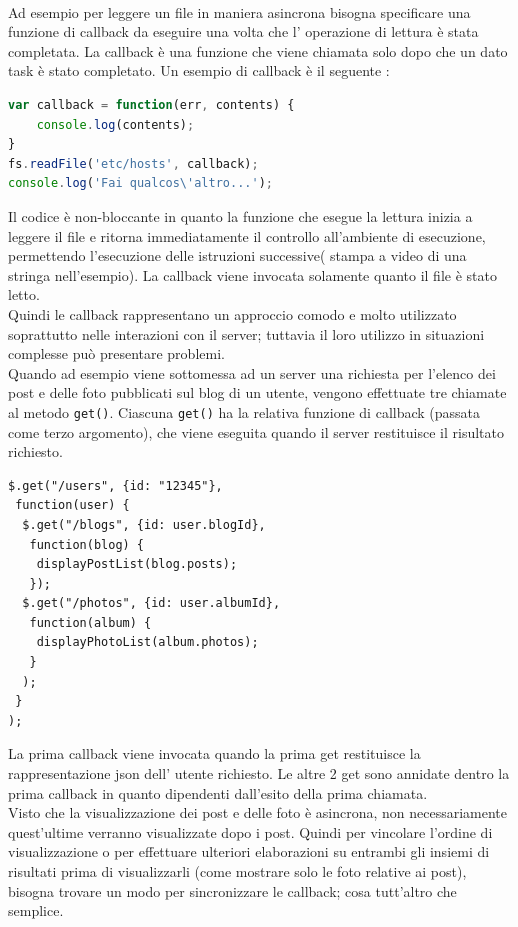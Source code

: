 \\
Ad esempio per leggere un file in maniera asincrona bisogna specificare una funzione di callback da eseguire una volta che l’ operazione di lettura è stata completata.
La callback è una funzione che viene chiamata solo dopo che un dato task è stato completato.
Un esempio di callback è il seguente :
\begin{lstlisting}[language=javascript]
var callback = function(err, contents) {
	console.log(contents);
}
fs.readFile('etc/hosts', callback);
console.log('Fai qualcos\'altro...');
\end{lstlisting}
Il codice è non-bloccante in quanto la funzione che esegue la lettura inizia a leggere il file e ritorna immediatamente il controllo all’ambiente di esecuzione, permettendo l’esecuzione delle istruzioni successive( stampa a video di una stringa nell’esempio). 
La callback viene invocata solamente quanto il file è stato letto.
\\
Quindi le callback rappresentano un approccio comodo e molto utilizzato soprattutto nelle interazioni con il server; tuttavia il loro utilizzo in situazioni complesse può presentare problemi.
\\
Quando ad esempio viene sottomessa ad un server una richiesta per l’elenco dei post e delle foto pubblicati sul blog di un utente, vengono effettuate tre chiamate al metodo \texttt{get()}. 
Ciascuna \texttt{get()} ha la relativa funzione di callback (passata come terzo argomento), che viene eseguita quando il server restituisce il risultato richiesto.
\begin{lstlisting}
$.get("/users", {id: "12345"},
 function(user) {
  $.get("/blogs", {id: user.blogId},
   function(blog) {
   	displayPostList(blog.posts);
   });
  $.get("/photos", {id: user.albumId},
   function(album) {
   	displayPhotoList(album.photos);
   }
  );	
 }
);
\end{lstlisting}
La prima callback viene invocata quando la prima get restituisce la rappresentazione json dell’ utente richiesto. Le altre 2 get sono annidate dentro la prima callback in quanto dipendenti dall’esito della prima chiamata.
\\ 
Visto che la visualizzazione dei post e delle foto è asincrona, non necessariamente quest’ultime verranno visualizzate dopo i post. Quindi per vincolare l’ordine di visualizzazione o per effettuare ulteriori elaborazioni su entrambi gli insiemi di risultati prima di visualizzarli (come mostrare solo le foto relative ai post), bisogna trovare un modo per sincronizzare le callback; cosa tutt’altro che semplice.
